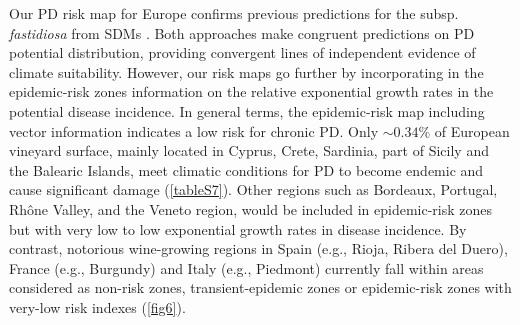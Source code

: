     Our PD risk map for Europe confirms previous predictions for the subsp.
    \textit{fastidiosa} from SDMs \cite{Bragard2019}. Both approaches make
    congruent predictions on PD potential distribution, providing convergent
    lines
    of independent evidence of climate suitability. However, our risk maps go
    further by incorporating in the epidemic-risk zones information on the
    relative
    exponential growth rates in the potential disease incidence. In general
    terms,
    the epidemic-risk map including vector information indicates a low risk for
    chronic PD. Only $\sim 0.34\%$ of European vineyard surface, mainly located
    in
    Cyprus, Crete, Sardinia, part of Sicily and the Balearic Islands, meet
    climatic
    conditions for PD to become endemic and cause significant damage
    (\cref{tableS7}). Other regions such as Bordeaux,
    Portugal,
    Rh\^one Valley, and the Veneto region, would be included in epidemic-risk
    zones
    but with very low to low exponential growth rates in disease incidence. By
    contrast, notorious wine-growing regions in Spain (e.g., Rioja, Ribera del
    Duero), France (e.g., Burgundy) and Italy (e.g., Piedmont) currently fall
    within areas considered as non-risk zones, transient-epidemic zones or
    epidemic-risk zones with very-low risk indexes (\cref{fig6}).

